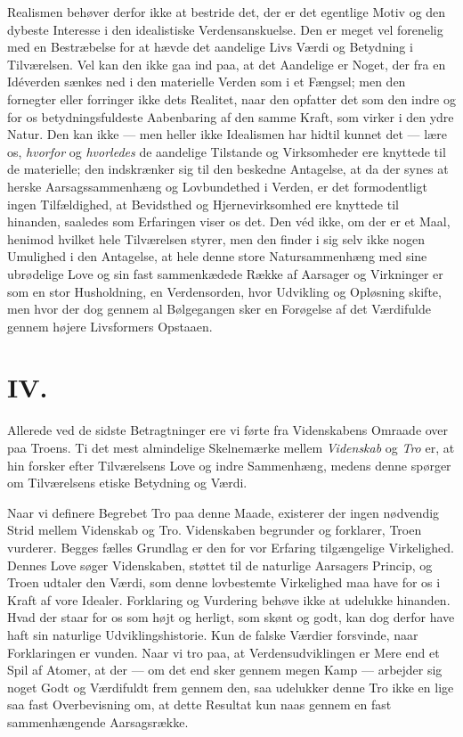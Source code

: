 \documentclass[12pt,a4paper]{article}
\newcommand{\opage}[1]{\marginnote{\footnotesize\textit{[#1]}}}
\begin{document}
Realismen behøver derfor ikke at bestride det, der er det egentlige
Motiv og den dybeste Interesse i den idealistiske Verdensanskuelse. Den
er meget vel forenelig med en Bestræbelse for at hævde det aandelige
Livs Værdi og Betydning i Tilværelsen. Vel kan den ikke gaa ind paa, at
det Aandelige er Noget, der fra en Idéverden sænkes ned i den materielle
Verden som i et Fængsel; men den fornegter eller forringer ikke dets
Realitet, naar den opfatter det som den indre og for os
betydningsfuldeste Aabenbaring af den samme Kraft, som virker i den
ydre Natur. Den kan ikke --- men heller ikke Idealismen har hidtil
kunnet det --- lære os, \emph{hvorfor} og \emph{hvorledes} de aandelige Tilstande og
Virksomheder ere knyttede til de materielle; den indskrænker sig til den
beskedne Antagelse, at da der synes at herske Aarsagssammenhæng og
Lovbundethed i Verden, er det formodentligt ingen Tilfældighed, at
Bevidsthed og Hjernevirksomhed ere knyttede til hinanden, saaledes som
Erfaringen viser os det.
\opage{10}Den véd ikke, om der er et Maal, henimod hvilket hele Tilværelsen
styrer, men den finder i sig selv ikke nogen Umulighed i den Antagelse,
at hele denne store Natursammenhæng med sine ubrødelige Love og sin fast
sammenkædede Række af Aarsager og Virkninger er som en stor Husholdning,
en Verdensorden, hvor Udvikling og Opløsning skifte, men hvor der dog
gennem al Bølgegangen sker en Forøgelse af det Værdifulde gennem højere
Livsformers Opstaaen.

\section*{IV.}

Allerede ved de sidste Betragtninger ere vi førte fra Videnskabens
Omraade over paa Troens. Ti det mest almindelige Skelnemærke mellem
\emph{Videnskab} og \emph{Tro} er, at hin forsker efter Tilværelsens Love og indre
Sammenhæng, medens denne spørger om Tilværelsens etiske Betydning og
Værdi.

Naar vi definere Begrebet Tro paa denne Maade, existerer der ingen
nødvendig Strid mellem Videnskab og Tro. Videnskaben begrunder og
forklarer, Troen vurderer. Begges fælles Grundlag er den for vor
Erfaring tilgængelige Virkelighed. Dennes Love søger Videnskaben, støttet
til de naturlige Aarsagers Princip, og Troen udtaler den Værdi, som
denne lovbestemte Virkelighed maa have for os i Kraft af vore Idealer.
Forklaring og Vurdering behøve ikke at udelukke hinanden. Hvad der staar
for os som højt og herligt, som skønt og godt, kan dog derfor have haft
sin naturlige Udviklingshistorie. Kun de falske Værdier forsvinde, naar
Forklaringen er vunden. Naar vi tro paa, at Verdensudviklingen er Mere
end et Spil af Atomer, at der --- om det end sker gennem megen Kamp ---
arbejder sig noget Godt og Værdifuldt frem gennem den, saa udelukker
denne Tro ikke en lige saa fast Overbevisning om, at dette Resultat kun
naas gennem en fast sammenhængende Aarsagsrække.
\end{document}
